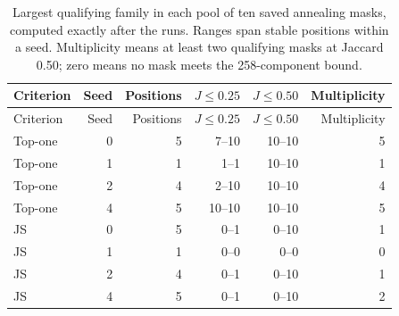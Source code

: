\begingroup\small\setlength{\tabcolsep}{4pt}
\begin{longtable}{lrrrrr}
\caption{Largest qualifying family in each pool of ten saved annealing masks, computed exactly after the runs. Ranges span stable positions within a seed. Multiplicity means at least two qualifying masks at Jaccard 0.50; zero means no mask meets the 258-component bound.}\label{tab:savedfamilies}\\
\toprule
Criterion & Seed & Positions & $J\leq0.25$ & $J\leq0.50$ & Multiplicity \\

\midrule\endfirsthead
\toprule
Criterion & Seed & Positions & $J\leq0.25$ & $J\leq0.50$ & Multiplicity \\

\midrule\endhead
\bottomrule\endfoot
Top-one & 0 & 5 & 7--10 & 10--10 & 5 \\
Top-one & 1 & 1 & 1--1 & 10--10 & 1 \\
Top-one & 2 & 4 & 2--10 & 10--10 & 4 \\
Top-one & 4 & 5 & 10--10 & 10--10 & 5 \\
JS & 0 & 5 & 0--1 & 0--10 & 1 \\
JS & 1 & 1 & 0--0 & 0--0 & 0 \\
JS & 2 & 4 & 0--1 & 0--10 & 1 \\
JS & 4 & 5 & 0--1 & 0--10 & 2 \\
\end{longtable}
\endgroup

